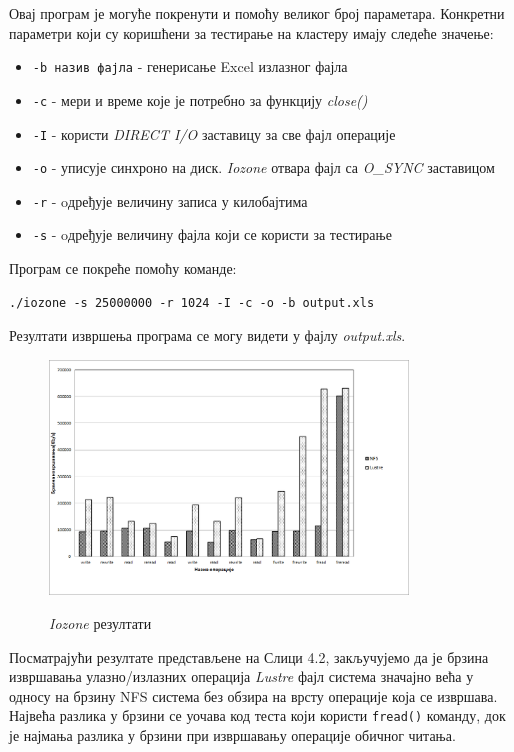 Овај програм је могуће покренути и помоћу великог број параметара. Конкретни параметри који су коришћени за тестирање на кластеру имају следеће значење:

\begin{itemize}
\item \texttt{-b назив фајла} - генерисање Excel излазног фајла
\item \texttt{-c} - мери и време које је потребно за функцију \textit{ close()}
\item \texttt{-I} - користи \textit{DIRECT I/O} заставицу за све фајл операције
\item \texttt{-о} - уписује синхроно на диск. \textit{Iozone} отвара фајл са \textit{O\_SYNC} заставицом
\item \texttt{-r} - oдређује величину записа у килобајтима
\item \texttt{-s} - oдређује величину фајла који се користи за тестирање 
\end{itemize}
Програм се покреће помоћу команде:
\begin{verbatim}
./iozone -s 25000000 -r 1024 -I -c -o -b output.xls
\end{verbatim}

Резултати извршења програма се могу видети у фајлу \textit{output.xls}.

  \begin{figure}[h!]
    \centering
        \includegraphics[width=0.85\textwidth]{slike/results/iozone.png}\\[1cm]
    \caption{\textit{Iozone} резултати}
  \end{figure}
  
Посматрајући резултате представљене на Слици 4.2, закључујемо да је брзина извршавања улазно/излазних операција \textit{Lustre} фајл система значајно већа у односу на брзину NFS система без обзира на врсту операције која се извршава. Највећа разлика у брзини се уочава код теста који користи \texttt{fread()} команду, док је најмања разлика у брзини при извршавању операције обичног читања.
  
